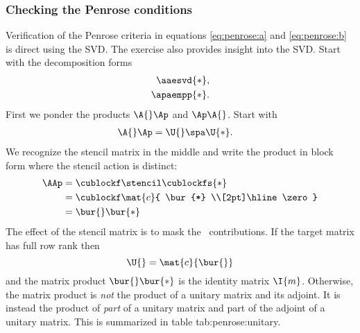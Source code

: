 \subsubsection{Checking the Penrose conditions}
Verification of the Penrose criteria in equations \eqref{eq:penrose:a} and \eqref{eq:penrose:b} is direct using the SVD. The exercise also provides insight into the SVD. Start with the decomposition forms
\begin{equation*}
  \begin{split}
    \aaesvd{*}, \\
    \apaempp{*}.
  \end{split}
\end{equation*}
First we ponder the products $\A{} \Ap$ and $\Ap \A{}$. Start with
\begin{equation}
  \begin{split}
    \A{} \Ap &= \U{} \spa \U{*}.
  \end{split}
\end{equation}
We recognize the stencil matrix in the middle and write the product in block form where the stencil action is distinct:
%
\begin{equation}
  \begin{split}
    \AAp 
      &= \cublockf \stencil \cublockfs{*} \\
      &= \cublockf \mat{c}{ \bur{*} \\[2pt]\hline \zero } \\
      &= \bur{} \bur{*}
  \end{split}
  \label{eq:penrose:aap}
\end{equation}
%
The effect of the stencil matrix is to mask the \ns \ contributions. If the target matrix has full row rank then
\begin{equation}
  \U{} = \mat{c}{\bur{}}
\end{equation}
and the matrix product $\bur{} \bur{*}$ is the identity matrix $\I{m}$. Otherwise, the matrix product is \emph{not} the product of a unitary matrix and its adjoint. It is instead the product of \emph{part} of a unitary matrix and part of the adjoint of a unitary matrix. This is summarized in table {tab:penrose:unitary}.

